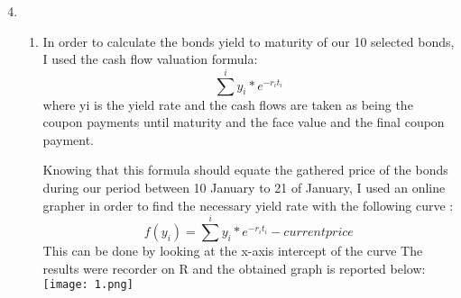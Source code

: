 \documentclass{article}
\begin{document}
\begin{enumerate}
\setcounter{enumi}{3} 
    \item \hfill
    \begin{enumerate}
        \item  In order to calculate the bonds yield to maturity of our 10 selected bonds, I used the cash flow valuation formula: \begin{equation}
        \sum^{i}y_i*e^{-r_it_i}
        \end{equation}
        where yi is the yield rate and the cash flows are taken as being the coupon payments until maturity and the face value and the final coupon payment.
        
        Knowing that this formula should equate the gathered price of the bonds during our period between 10 January to 21 of January, I used an online grapher in order to find the necessary yield rate with the following curve : \begin{equation}
        f(y_i) = \sum^{i}y_i*e^{-r_it_i} - current price 
        \end{equation}
        This can be done by looking at the x-axis intercept of the curve The results were recorder on R and the obtained graph is reported below:\\
        \texttt{[image: 1.png]}
        \centering
        

\end{enumerate}
\end{enumerate}
\end{document}
